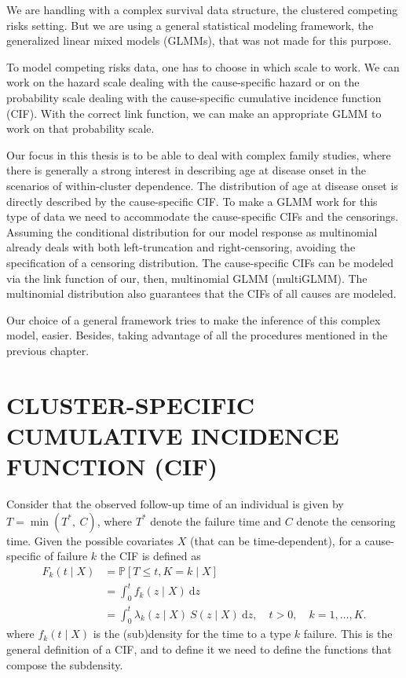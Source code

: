 We are handling with a complex survival data structure, the clustered
competing risks setting. But we are using a general statistical modeling
framework, the generalized linear mixed models (GLMMs), that was not
made for this purpose.

To model competing risks data, one has to choose in which scale to work.
We can work on the hazard scale dealing with the cause-specific hazard
or on the probability scale dealing with the cause-specific cumulative
incidence function (CIF). With the correct link function, we can make an
appropriate GLMM to work on that probability scale.

Our focus in this thesis is to be able to deal with complex family
studies, where there is generally a strong interest in describing age at
disease onset in the scenarios of within-cluster dependence. The
distribution of age at disease onset is directly described by the
cause-specific CIF. To make a GLMM work for this type of data we need to
accommodate the cause-specific CIFs and the censorings. Assuming the
conditional distribution for our model response as multinomial already
deals with both left-truncation and right-censoring, avoiding the
specification of a censoring distribution. The cause-specific CIFs can
be modeled via the link function of our, then, multinomial GLMM
(multiGLMM). The multinomial distribution also guarantees that the CIFs
of all causes are modeled.

Our choice of a general framework tries to make the inference of this
complex model, easier. Besides, taking advantage of all the procedures
mentioned in the previous chapter.

\section{CLUSTER-SPECIFIC CUMULATIVE INCIDENCE FUNCTION
  (CIF)}
\label{cap:cif}

Consider that the observed follow-up time of an individual is given by
\(T = \min(T^{\ast},~C)\), where \(T^{\ast}\) denote the failure time
and \(C\) denote the censoring time. Given the possible covariates \(X\)
(that can be time-dependent), for a cause-specific of failure \(k\) the
CIF is defined as
\begin{align*}
  F_{k}(t \mid X) &= \mathbb{P}[T \leq t, K = k \mid X]\\
                  &= \int_{0}^{t} f_{k}(z \mid X)~\text{d}z\\
                  &= \int_{0}^{t} \lambda_{k}(z \mid X)~S(z \mid X)
                    ~\text{d}z, \quad t > 0, \quad k = 1, \dots, K.
\end{align*}
where \(f_{k}(t \mid X)\) is the (sub)density for the time to a type
\(k\) failure. This is the general definition of a CIF, and to define it
we need to define the functions that compose the subdensity.


